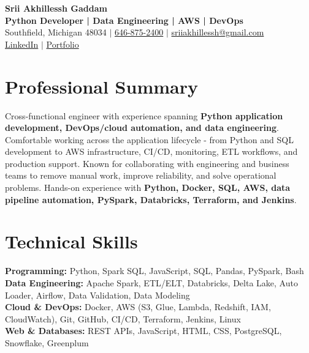 \documentclass[letterpaper,10pt]{article}
\begin{document}
\fontsize{9.35pt}{10.45pt}\selectfont

\begin{center}
    {\LARGE \textbf{Srii Akhillessh Gaddam}} \\[-1pt]
    \textbf{Python Developer | Data Engineering | AWS | DevOps} \\[2pt]
    Southfield, Michigan 48034 $|$
    \href{tel:6468752400}{646-875-2400} $|$
    \href{mailto:sriiakhillessh@gmail.com}{sriiakhillessh@gmail.com} \\[1pt]
    \href{https://www.linkedin.com/in/srii-akhiilessh-gaddam-b48668191/}{LinkedIn} $|$
    \href{https://sriiakhillesshg.github.io/portfolio/}{Portfolio}
\end{center}
\vspace{-8pt}

\section{Professional Summary}
\small{Cross-functional engineer with experience spanning \textbf{Python application development, DevOps/cloud automation, and data engineering}. Comfortable working across the application lifecycle - from Python and SQL development to AWS infrastructure, CI/CD, monitoring, ETL workflows, and production support. Known for collaborating with engineering and business teams to remove manual work, improve reliability, and solve operational problems. Hands-on experience with \textbf{Python, Docker, SQL, AWS, data pipeline automation, PySpark, Databricks, Terraform, and Jenkins}.}

\section{Technical Skills}
\small{
\textbf{Programming:} Python, Spark SQL, JavaScript, SQL, Pandas, PySpark, Bash \\
\textbf{Data Engineering:} Apache Spark, ETL/ELT, Databricks, Delta Lake, Auto Loader, Airflow, Data Validation, Data Modeling \\
\textbf{Cloud \& DevOps:} Docker, AWS (S3, Glue, Lambda, Redshift, IAM, CloudWatch), Git, GitHub, CI/CD, Terraform, Jenkins, Linux \\
\textbf{Web \& Databases:} REST APIs, JavaScript, HTML, CSS, PostgreSQL, Snowflake, Greenplum
}
\end{document}
